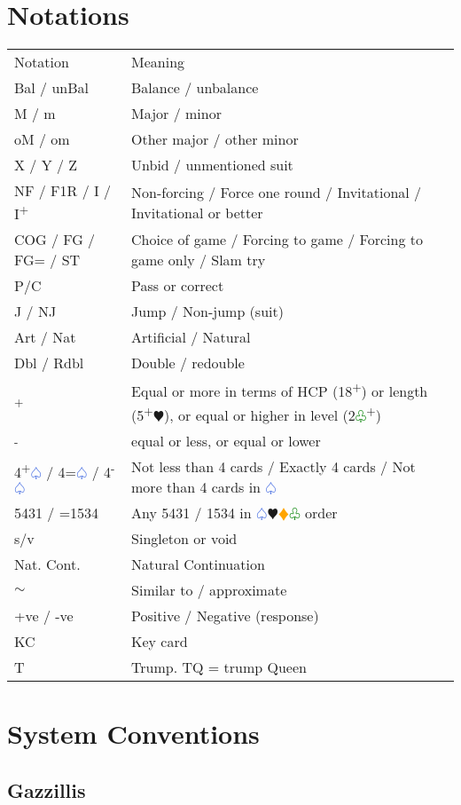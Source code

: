 \documentclass{article}
\renewcommand{\sp}{\textcolor{RoyalBlue}{$\varspade$}}
\newcommand{\he}{\textcolor{RubineRed}{$\varheart$}}
\newcommand{\di}{\textcolor{Orange}{$\vardiamond$}}
\newcommand{\cl}{\textcolor{Green}{$\varclub$}}
\newcommand{\up}{\textsuperscript{+}}
\newcommand{\down}{\textsuperscript{-}}
\begin{document}
\section{Notations}
\begin{tabular}{|l|p{5.5cm}}
	Notation & Meaning \\
	Bal / unBal & Balance / unbalance \\
	M / m & Major / minor \\
	oM / om & Other major / other minor \\
	X / Y / Z & Unbid / unmentioned suit \\
	NF / F1R / I / I\up & Non-forcing / Force one round / Invitational / Invitational or better \\
	COG / FG / FG= / ST & Choice of game / Forcing to game / Forcing to game only / Slam try \\
	P/C & Pass or correct  \\
	J / NJ & Jump / Non-jump (suit) \\
	Art / Nat & Artificial / Natural \\
	Dbl / Rdbl & Double / redouble \\
	\up{} & Equal or more in terms of HCP (18\up{}) or length (5\up\he{}), or equal or higher in level (2\cl{}\up{}) \\
	\down{} & equal or less, or equal or lower \\
	4\up\sp{} / 4=\sp{} / 4\down\sp{} & Not less than 4 cards / Exactly 4 cards / Not more than 4 cards in \sp{}\\
	5431 / =1534 & Any 5431 / 1534 in \sp{}\he{}\di{}\cl{} order \\
	s/v & Singleton or void \\
 	Nat. Cont. & Natural Continuation \\
	$\sim$ & Similar to / approximate \\
	+ve / -ve & Positive / Negative (response) \\
	KC & Key card \\
	T & Trump. TQ = trump Queen  \\
\end{tabular}

\section{System Conventions}
\subsection{Gazzillis}
\end{document}
